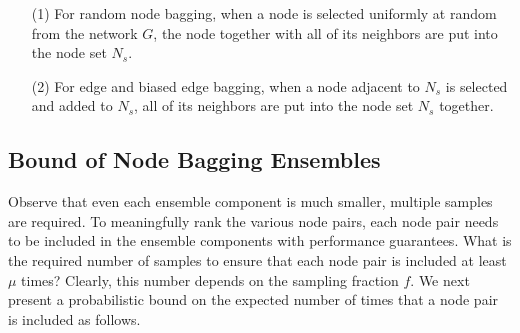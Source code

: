 


\vspace{-1ex}
\begin{enumerate}
\item[(1)]
For random node bagging, when a node is selected uniformly at random from the network $G$, the node together with all of
its neighbors are put into the node set $N_s$.
\item[(2)]
For edge and biased edge bagging, when a node adjacent to $N_s$ is
 selected and added to $N_s$, all of its neighbors are put into the node set $N_s$ together.
\end{enumerate}
\vspace{-1ex}


\subsection{Bound of Node Bagging Ensembles}

Observe that even each ensemble component is much smaller,
multiple samples are required. To meaningfully rank the various node
pairs, each node pair needs to be included in the ensemble components with performance guarantees.
What is the required number of samples to
ensure that each node pair is included  at least $\mu$ times? Clearly,
this number depends on the sampling fraction $f$. We next present a
probabilistic bound on the expected number of times that a node pair is included as follows.



